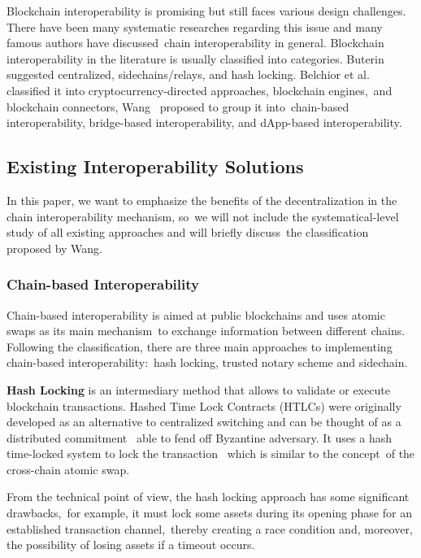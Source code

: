 Blockchain interoperability is promising but still faces various design challenges.
There have been many systematic researches regarding this issue and many famous authors have discussed\
chain interoperability in general.
Blockchain interoperability in the literature is usually classified into categories.
Buterin~\cite{buterin2016} suggested centralized, sidechains/relays, and hash locking.
Belchior et al.~\cite{belchior2021survey} classified it into cryptocurrency-directed approaches, blockchain engines,\
and blockchain connectors, Wang~\cite{cryptoeprint:2021/537} proposed to group it into\
chain-based interoperability, bridge-based interoperability, and dApp-based interoperability.

\subsection{Existing Interoperability Solutions}\label{subsec:interoperability-categories}
In this paper, we want to emphasize the benefits of the decentralization in the chain interoperability mechanism, so\
we will not include the systematical-level study of all existing approaches and will briefly discuss\
the classification proposed by Wang.

\subsubsection{Chain-based Interoperability}
Chain-based interoperability is aimed at public blockchains and uses atomic swaps as its main mechanism\
to exchange information between different chains.
Following the classification, there are three main approaches to implementing chain-based interoperability:\
hash locking, trusted notary scheme and sidechain.

\textbf{Hash Locking} is an intermediary method that allows to validate or execute blockchain transactions.
Hashed Time Lock Contracts (HTLCs) were originally developed as an alternative to centralized switching
and can be thought of as a distributed commitment~\cite{Kumar2021} able to fend off Byzantine adversary.
It uses a hash time-locked system to lock the transaction~\cite{Pillai2019} which is similar to the concept\
of the cross-chain atomic swap.

From the technical point of view, the hash locking approach has some significant drawbacks,\
for example, it must lock some assets during its opening phase for an established transaction channel,\
thereby creating a race condition and, moreover, the possibility of losing assets if a timeout occurs.

